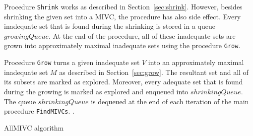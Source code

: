 Procedure \texttt{Shrink} works as described in Section~\ref{sec:shrink}. However, besides shrinking the given set into a MIVC, the procedure has also side effect. Every inadequate set that is found during the shrinking is stored in a queue $\mathit{growingQueue}$. At the end of the procedure, all of these inadequate sets are grown into approximately maximal inadequate sets using the procedure \texttt{Grow}.

Procedure \texttt{Grow} turns a given inadequate set $V$ into an approximately maximal inadequate set $M$ as described in Section~\ref{sec:grow}. The resultant set and all of its subsets are marked as explored. Moreover, every adequate set that is found during the growing is marked as explored and enqueued into $\mathit{shrinkingQueue}$. 
The queue $\mathit{shrinkingQueue}$ is dequeued at the end of each iteration of the main procedure \texttt{FindMIVCs}.  .




\begin{algorithm}[!t]

\caption{AllMIVC algorithm}
\label{alg:allmivc}
\end{algorithm}





